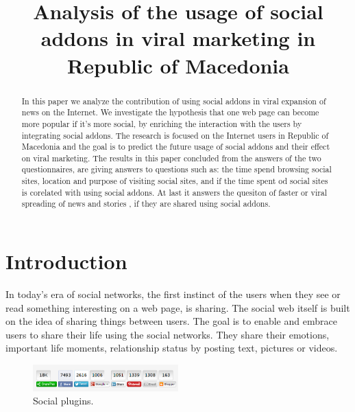 \documentclass[conference]{IEEEtran}
\begin{document}
\title{Analysis of the usage of social addons in viral marketing in Republic of Macedonia}

\author{
\and
{}
\and
{}
}

\maketitle

\begin{abstract}
In this paper we analyze the contribution of using social addons in viral
expansion of news on the Internet. We investigate the hypothesis that one web
page can become more popular if it's more social, by enriching the interaction
with the users by integrating social addons. The research is focused on the
Internet users in Republic of Macedonia and the goal is to predict the future
usage of social addons and their effect on viral marketing. The results in
this paper concluded from the answers of the two questionnaires, are giving
answers to questions such as: the time spend browsing social sites, location
and purpose of visiting social sites, and if the time spent od social sites
is corelated with using social addons. At last it answers the quesiton of faster
or viral spreading of news and stories , if they are shared using social addons.
\end{abstract}

\section{Introduction}
In today’s era of social networks, the first instinct of the users when they see
or read something interesting on a web page, is sharing. The social web itself
is built on the idea of sharing things between users. The goal is to enable and
embrace users to share their life using the social networks. They share their
emotions, important life moments, relationship status by posting text, pictures
or videos.

\begin{figure}[htb]
\centering
\includegraphics[width=0.5\textwidth]{viral-images/social_plugins}
\caption{Social plugins.}
\label{fig:social_plugins}
\end{figure}
\end{document}
